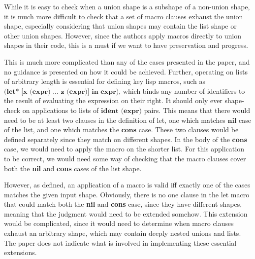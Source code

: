 \documentclass[11pt]{article}
\begin{document}
While it is easy to check when a union shape is a subshape of a non-union shape, it is much more difficult to check that a set of macro clauses exhaust the union shape, especially considering that union shapes may contain the list shape or other union shapes. However, since the authors apply macros directly to union shapes in their code, this is a must if we want to have preservation and progress.

This is much more complicated than any of the cases presented in the paper, and no guidance is presented on how it could be achieved. Further, operating on lists of arbitrary length is essential for defining key lisp macros, such as $\textbf{(let* [x (expr) ... z (expr)] in expr)}$, which binds any number of identifiers to the result of evaluating the expression on their right. It should only ever shape-check on applications to lists of $\textbf{ident (expr)}$ pairs. This means that there would need to be at least two clauses in the definition of let, one which matches $\textbf{nil}$ case of the list, and one which matches the $\textbf{cons}$ case. These two clauses would be defined separately since they match on different shapes. In the body of the $\textbf{cons}$ case, we would need to apply the macro on the shorter list. For this application to be correct, we would need some way of checking that the macro clauses cover both the \textbf{nil} and \textbf{cons} cases of the list shape. 

However, as defined, an application of a macro is valid iff exactly one of the cases matches the given input shape. Obviously, there is no one clause in the let macro that could match both the \textbf{nil} and \textbf{cons} case, since they have different shapes, meaning that the judgment would need to be extended somehow. This extension would be complicated, since it would need to determine when macro clauses exhaust an arbitrary shape, which may contain deeply nested unions and lists. The paper does not indicate what is involved in implementing these essential extensions.

\end{document}
